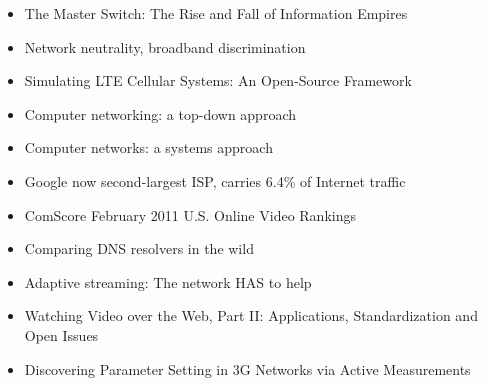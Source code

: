 \begin{itemize}
\item The Master Switch: The Rise and Fall of Information Empires \cite{wu2010master}
\item Network neutrality, broadband discrimination \cite{wu2003network}
\item Simulating LTE Cellular Systems: An Open-Source Framework \cite{5634134}
\item Computer networking: a top-down approach \cite{kurose2008computer}
\item Computer networks: a systems approach \cite{peterson2007computer}
\item Google now second-largest ISP, carries 6.4\% of Internet traffic \cite{nw2010carrier}
\item ComScore February 2011 U.S. Online Video Rankings \cite{comscore2011ranking}
\item Comparing DNS resolvers in the wild \cite{ager2010comparing}
\item Adaptive streaming: The network HAS to help \cite{BLTJ:BLTJ20505}
\item Watching Video over the Web, Part II: Applications, Standardization and Open Issues \cite{watching-video2}
\item Discovering Parameter Setting in 3G Networks via Active Measurements \cite{4640935}
\end{itemize}